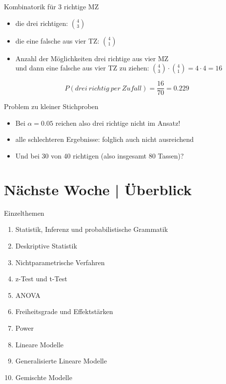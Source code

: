 \begin{frame}
  {Kombinatorik für 3 richtige MZ}
  \begin{itemize}[<+->]
    \item die drei richtigen: $\binom{4}{3}$
    \item die eine falsche aus vier TZ: $\binom{4}{1}$
    \item Anzahl der Möglichkeiten drei richtige aus vier MZ\\
      und dann eine falsche aus vier TZ zu ziehen: $\binom{4}{3}\cdot\binom{4}{1}=4\cdot4=16$
  \end{itemize}
  \Zeile
  \pause
  \begin{equation}
    P(drei\ richtig\ per\ Zufall)=\frac{16}{70}=0.229
  \end{equation}
\end{frame}

\begin{frame}
  {Problem zu kleiner Stichproben}
  \begin{itemize}[<+->]
    \item \alert{Bei $\alpha=0.05$ reichen also drei richtige nicht im Ansatz!}
    \item alle schlechteren Ergebnisse: folglich auch nicht ausreichend
    \item Und bei 30 von 40 richtigen (also insgesamt 80 Tassen)?
  \end{itemize}
\end{frame}


\ifdefined\TITLE
  \section{Nächste Woche | Überblick}

  \begin{frame}
    {Einzelthemen}
    \begin{enumerate}
      \item Statistik, Inferenz und probabilistische Grammatik
      \item \alert{Deskriptive Statistik}
      \item Nichtparametrische Verfahren
      \item z-Test und t-Test
      \item ANOVA
      \item Freiheitsgrade und Effektstärken
      \item Power
      \item Lineare Modelle
      \item Generalisierte Lineare Modelle
      \item Gemischte Modelle
    \end{enumerate}
  \end{frame}
\fi

